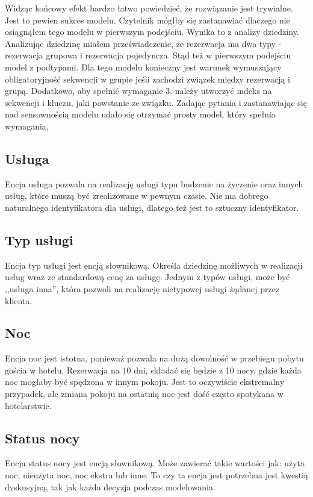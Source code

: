 \documentclass[a4paper,onecolumn,oneside,11pt,wide,floatssmall]{mwrep}
\theoremstyle{definition}
\theoremstyle{plain}%
\theoremstyle{remark}
\begin{document}
Widząc końcowy efekt bardzo łatwo powiedzieć, że rozwiązanie jest trywialne. Jest to pewien sukces modelu. Czytelnik mógłby się zastanawiać dlaczego nie osiągnąłem tego modelu w pierwszym podejściu. Wynika to z analizy dziedziny. Analizując dziedzinę miałem przeświadczenie, że rezerwacja ma dwa typy - rezerwacja grupowa i rezerwacja pojedyncza. Stąd też w pierwszym podejściu model z podtypami. Dla tego modelu konieczny jest warunek wymuszający obligatoryjność sekwencji w grupie jeśli zachodzi związek między rezerwacją i grupą. Dodatkowo, aby spełnić wymaganie 3. należy utworzyć indeks na sekwencji i kluczu, jaki powstanie ze związku. Zadając pytania i zastanawiając się nad sensownością modelu udało się otrzymać prosty model, który spełnia wymagania.

\subsection{Usługa}
Encja usługa pozwala na realizację usługi typu budzenie na życzenie oraz innych usług, które muszą być zrealizowane w pewnym czasie. Nie ma dobrego naturalnego identyfikatora dla usługi, dlatego też jest to sztuczny identyfikator.

\subsection{Typ usługi}
Encja typ usługi jest encją słownikową. Określa dziedzinę możliwych w realizacji usług wraz ze standardową cenę za usługę. Jednym z typów usługi, może być ,,usługa inna'', która pozwoli na realizację nietypowej usługi żądanej przez klienta.

\subsection{Noc}
Encja noc jest istotna, ponieważ pozwala na dużą dowolność w przebiegu pobytu gościa w hotelu. Rezerwacja na 10 dni, składać się będzie z 10 nocy, gdzie każda noc mogłaby być spędzona w innym pokoju. Jest to oczywiście ekstremalny przypadek, ale zmiana pokoju na ostatnią noc jest dość często spotykana w hotelarstwie.

\subsection{Status nocy}
Encja status nocy jest encją słownikową. Może zawierać takie wartości jak: użyta noc, nieużyta noc, noc ekstra lub inne. To czy ta encja jest potrzebna jest kwestią dyskusyjną, tak jak każda decyzja podczas modelowania.
\end{document}
